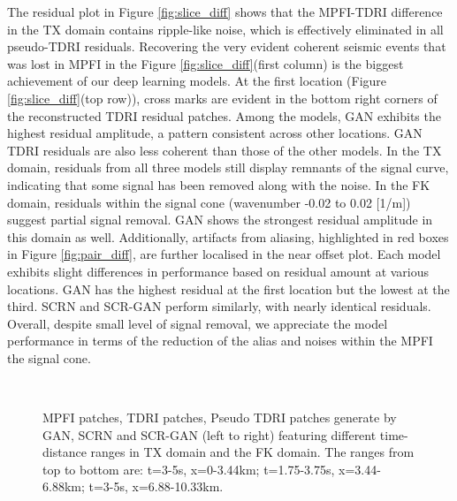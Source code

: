 \noindent The residual plot in Figure \ref{fig:slice_diff} shows that the MPFI-TDRI difference in the TX domain contains ripple-like noise, which is effectively eliminated in all pseudo-TDRI residuals. Recovering the very evident coherent seismic events that was lost in MPFI in the Figure \ref{fig:slice_diff}(first column) is the biggest achievement of our deep learning models. At the first location (Figure \ref{fig:slice_diff}(top row)), cross marks are evident in the bottom right corners of the reconstructed TDRI residual patches. Among the models, GAN exhibits the highest residual amplitude, a pattern consistent across other locations. GAN TDRI residuals are also less coherent than those of the other models. In the TX domain, residuals from all three models still display remnants of the signal curve, indicating that some signal has been removed along with the noise. In the FK domain, residuals within the signal cone (wavenumber -0.02 to 0.02 [1/m]) suggest partial signal removal. GAN shows the strongest residual amplitude in this domain as well. Additionally, artifacts from aliasing, highlighted in red boxes in Figure \ref{fig:pair_diff}, are further localised in the near offset plot. Each model exhibits slight differences in performance based on residual amount at various locations. GAN has the highest residual at the first location but the lowest at the third. SCRN and SCR-GAN perform similarly, with nearly identical residuals. Overall, despite small level of signal removal, we appreciate the model performance in terms of the reduction of the alias and noises within the MPFI the signal cone.

\begin{figure}[!ht]
	\centering
	\\
	\caption{MPFI patches, TDRI patches, Pseudo TDRI patches generate by GAN, SCRN and SCR-GAN (left to right) featuring different time-distance ranges in TX domain and the FK domain. The ranges from top to bottom are: t=3-5s, x=0-3.44km; t=1.75-3.75s, x=3.44-6.88km; t=3-5s, x=6.88-10.33km. }
	\label{fig:slices}
\end{figure}

